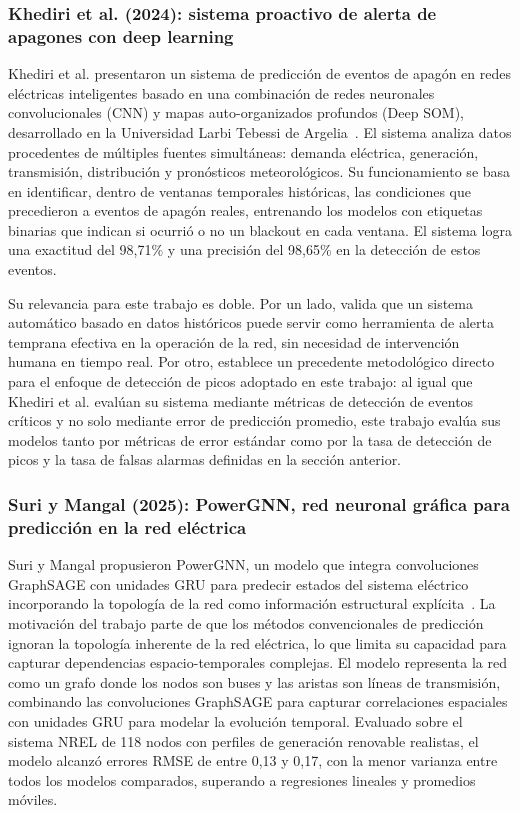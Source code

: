 \documentclass[12pt, a4paper]{article}
\begin{document}
\subsubsection{Khediri et al. (2024): sistema proactivo de alerta de apagones con deep learning}


Khediri et al. presentaron un sistema de predicción de eventos de apagón en redes eléctricas inteligentes basado en una combinación de redes neuronales convolucionales (CNN) y mapas auto-organizados profundos (Deep SOM), desarrollado en la Universidad Larbi Tebessi de Argelia~\cite{khediri2024}. El sistema analiza datos procedentes de múltiples fuentes simultáneas: demanda eléctrica, generación, transmisión, distribución y pronósticos meteorológicos. Su funcionamiento se basa en identificar, dentro de ventanas temporales históricas, las condiciones que precedieron a eventos de apagón reales, entrenando los modelos con etiquetas binarias que indican si ocurrió o no un blackout en cada ventana. El sistema logra una exactitud del 98,71\% y una precisión del 98,65\% en la detección de estos eventos.

Su relevancia para este trabajo es doble. Por un lado, valida que un sistema automático basado en datos históricos puede servir como herramienta de alerta temprana efectiva en la operación de la red, sin necesidad de intervención humana en tiempo real. Por otro, establece un precedente metodológico directo para el enfoque de detección de picos adoptado en este trabajo: al igual que Khediri et al. evalúan su sistema mediante métricas de detección de eventos críticos y no solo mediante error de predicción promedio, este trabajo evalúa sus modelos tanto por métricas de error estándar como por la tasa de detección de picos y la tasa de falsas alarmas definidas en la sección anterior.

\subsubsection{Suri y Mangal (2025): PowerGNN, red neuronal gráfica para predicción en la red eléctrica}


Suri y Mangal propusieron PowerGNN, un modelo que integra convoluciones GraphSAGE con unidades GRU para predecir estados del sistema eléctrico incorporando la topología de la red como información estructural explícita~\cite{suri2025}. La motivación del trabajo parte de que los métodos convencionales de predicción ignoran la topología inherente de la red eléctrica, lo que limita su capacidad para capturar dependencias espacio-temporales complejas. El modelo representa la red como un grafo donde los nodos son buses y las aristas son líneas de transmisión, combinando las convoluciones GraphSAGE para capturar correlaciones espaciales con unidades GRU para modelar la evolución temporal. Evaluado sobre el sistema NREL de 118 nodos con perfiles de generación renovable realistas, el modelo alcanzó errores RMSE de entre 0,13 y 0,17, con la menor varianza entre todos los modelos comparados, superando a regresiones lineales y promedios móviles.
\end{document}
